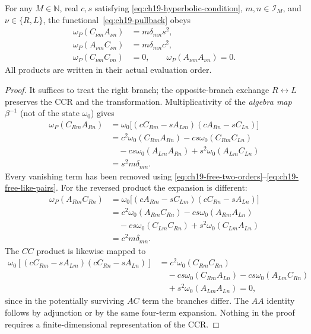 \begin{theorem}
\label{thm:ch19-mode-same-branch}
For any $M\in\mathbb N$, real $c,s$ satisfying
\eqref{eq:ch19-hyperbolic-condition}, $m,n\in\mathcal I_M$, and
$\nu\in\{R,L\}$, the functional~\eqref{eq:ch19-pullback} obeys
\begin{align}
 \omega_P(C_{\nu m}A_{\nu n})
   &=m\delta_{mn}s^2,
   \label{eq:ch19-mode-CA}\\
 \omega_P(A_{\nu m}C_{\nu n})
   &=m\delta_{mn}c^2,
   \label{eq:ch19-mode-AC}\\
 \omega_P(C_{\nu m}C_{\nu n})
   &=0,\qquad
 \omega_P(A_{\nu m}A_{\nu n})=0.
 \label{eq:ch19-mode-like}
\end{align}
All products are written in their actual evaluation order.
\end{theorem}

\begin{proof}
It suffices to treat the right branch; the opposite-branch exchange
$R\leftrightarrow L$ preserves the CCR and the transformation.
Multiplicativity of the \emph{algebra map} $\beta^{-1}$ (not of the
state $\omega_0$) gives
\begin{align*}
 \omega_P(C_{Rm}A_{Rn})
 &=\omega_0\bigl[(cC_{Rm}-sA_{Lm})
                     (cA_{Rn}-sC_{Ln})\bigr]\\
 &=c^2\omega_0(C_{Rm}A_{Rn})
   -cs\omega_0(C_{Rm}C_{Ln})\\
 &\quad-cs\omega_0(A_{Lm}A_{Rn})
   +s^2\omega_0(A_{Lm}C_{Ln})\\
 &=s^2m\delta_{mn}.
\end{align*}
Every vanishing term has been removed using
\eqref{eq:ch19-free-two-orders}--\eqref{eq:ch19-free-like-pairs}.
For the reversed product the expansion is different:
\begin{align*}
 \omega_P(A_{Rm}C_{Rn})
 &=\omega_0\bigl[(cA_{Rm}-sC_{Lm})
                     (cC_{Rn}-sA_{Ln})\bigr]\\
 &=c^2\omega_0(A_{Rm}C_{Rn})
   -cs\omega_0(A_{Rm}A_{Ln})\\
 &\quad-cs\omega_0(C_{Lm}C_{Rn})
   +s^2\omega_0(C_{Lm}A_{Ln})\\
 &=c^2m\delta_{mn}.
\end{align*}
The $CC$ product is likewise mapped to
\begin{align*}
 \omega_0[(cC_{Rm}-sA_{Lm})(cC_{Rn}-sA_{Ln})]
 &=c^2\omega_0(C_{Rm}C_{Rn})\\
 &\quad-cs\omega_0(C_{Rm}A_{Ln})
   -cs\omega_0(A_{Lm}C_{Rn})\\
 &\quad+s^2\omega_0(A_{Lm}A_{Ln})=0,
\end{align*}
since in the potentially surviving $AC$ term the branches differ.
The $AA$ identity follows by adjunction or by the same four-term
expansion. Nothing in the proof requires a finite-dimensional
representation of the CCR.
\end{proof}

